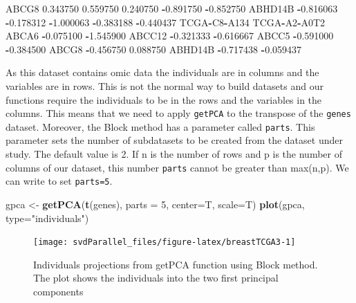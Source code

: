\documentclass[]{article}
\newenvironment{Shaded}{\begin{snugshade}}{\end{snugshade}}
\newcommand{\KeywordTok}[1]{\textcolor[rgb]{0.13,0.29,0.53}{\textbf{#1}}}
\newcommand{\DataTypeTok}[1]{\textcolor[rgb]{0.13,0.29,0.53}{#1}}
\newcommand{\DecValTok}[1]{\textcolor[rgb]{0.00,0.00,0.81}{#1}}
\newcommand{\FloatTok}[1]{\textcolor[rgb]{0.00,0.00,0.81}{#1}}
\newcommand{\StringTok}[1]{\textcolor[rgb]{0.31,0.60,0.02}{#1}}
\newcommand{\OperatorTok}[1]{\textcolor[rgb]{0.81,0.36,0.00}{\textbf{#1}}}
\newcommand{\NormalTok}[1]{#1}
\begin{document}
\begin{Shaded}
\begin{Highlighting}[]
\NormalTok{ABCG8       }\FloatTok{0.343750}     \FloatTok{0.559750}     \FloatTok{0.240750}    \OperatorTok{-}\FloatTok{0.891750}    \OperatorTok{-}\FloatTok{0.852750}
\NormalTok{ABHD14B    }\OperatorTok{-}\FloatTok{0.816063}    \OperatorTok{-}\FloatTok{0.178312}    \OperatorTok{-}\FloatTok{1.000063}    \OperatorTok{-}\FloatTok{0.383188}    \OperatorTok{-}\FloatTok{0.440437}
\NormalTok{        TCGA}\OperatorTok{-}\NormalTok{C8}\OperatorTok{-}\NormalTok{A134 TCGA}\OperatorTok{-}\NormalTok{A2}\OperatorTok{-}\NormalTok{A0T2}
\NormalTok{ABCA6      }\OperatorTok{-}\FloatTok{0.075100}    \OperatorTok{-}\FloatTok{1.545900}
\NormalTok{ABCC12     }\OperatorTok{-}\FloatTok{0.321333}    \OperatorTok{-}\FloatTok{0.616667}
\NormalTok{ABCC5      }\OperatorTok{-}\FloatTok{0.591000}    \OperatorTok{-}\FloatTok{0.384500}
\NormalTok{ABCG8      }\OperatorTok{-}\FloatTok{0.456750}     \FloatTok{0.088750}
\NormalTok{ABHD14B    }\OperatorTok{-}\FloatTok{0.717438}    \OperatorTok{-}\FloatTok{0.059437}
\end{Highlighting}
\end{Shaded}

As this dataset contains omic data the individuals are in columns and
the variables are in rows. This is not the normal way to build datasets
and our functions require the individuals to be in the rows and the
variables in the columns. This means that we need to apply
\texttt{getPCA} to the transpose of the \texttt{genes} dataset.
Moreover, the Block method has a parameter called \texttt{parts}. This
parameter sets the number of subdatasets to be created from the dataset
under study. The default value is 2. If n is the number of rows and p is
the number of columns of our dataset, this number \texttt{parts} cannot
be greater than max(n,p). We can write to set \texttt{parts=5}.

\begin{Shaded}
\begin{Highlighting}[]
\NormalTok{gpca <-}\StringTok{ }\KeywordTok{getPCA}\NormalTok{(}\KeywordTok{t}\NormalTok{(genes), }\DataTypeTok{parts =} \DecValTok{5}\NormalTok{, }\DataTypeTok{center=}\NormalTok{T, }\DataTypeTok{scale=}\NormalTok{T)}
\KeywordTok{plot}\NormalTok{(gpca, }\DataTypeTok{type=}\StringTok{"individuals"}\NormalTok{)}
\end{Highlighting}
\end{Shaded}

\begin{figure}

{\centering \texttt{[image: svdParallel\_files/figure-latex/breastTCGA3-1]} 

}

\caption{Individuals projections from getPCA function using Block method. The plot shows the individuals into the two first principal components}\label{fig:breastTCGA3}
\end{figure}
\end{document}

